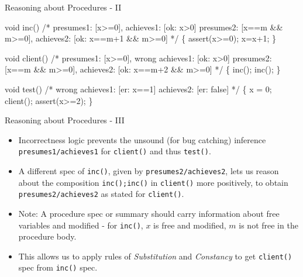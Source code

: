 \documentclass[
  10pt,
  ignorenonframetext,
]{beamer}
\newenvironment{Shaded}{\begin{snugshade}}{\end{snugshade}}
\newcommand{\CommentTok}[1]{\textcolor[rgb]{0.48,0.49,0.49}{#1}}
\newcommand{\DataTypeTok}[1]{\textcolor[rgb]{0.16,0.50,0.73}{#1}}
\newcommand{\DecValTok}[1]{\textcolor[rgb]{0.96,0.45,0.00}{#1}}
\newcommand{\NormalTok}[1]{\textcolor[rgb]{0.81,0.81,0.76}{#1}}
\newcommand{\OperatorTok}[1]{\textcolor[rgb]{0.81,0.81,0.76}{#1}}
\begin{document}
\begin{frame}[fragile]{Reasoning about Procedures - II}
\label{reasoning-about-procedures---ii}
\begin{Shaded}
\begin{Highlighting}[]
\DataTypeTok{void}\NormalTok{ inc}\OperatorTok{()}
\CommentTok{/* presumes1: [x\textgreater{}=0], achieves1: [ok: x\textgreater{}0]}
\CommentTok{   presumes2: [x==m \&\& m\textgreater{}=0], achieves2: [ok: x==m+1 \&\& m\textgreater{}=0] */}
\OperatorTok{\{}\NormalTok{   assert}\OperatorTok{(}\NormalTok{x}\OperatorTok{\textgreater{}=}\DecValTok{0}\OperatorTok{);}
\NormalTok{    x}\OperatorTok{=}\NormalTok{x}\OperatorTok{+}\DecValTok{1}\OperatorTok{;}
\OperatorTok{\}}

\DataTypeTok{void}\NormalTok{ client}\OperatorTok{()}
\CommentTok{/* presumes1: [x\textgreater{}=0], wrong achieves1: [ok: x\textgreater{}0]}
\CommentTok{   presumes2: [x==m \&\& m\textgreater{}=0], achieves2: [ok: x==m+2 \&\& m\textgreater{}=0] */}
\OperatorTok{\{}\NormalTok{   inc}\OperatorTok{();}\NormalTok{ inc}\OperatorTok{();} \OperatorTok{\}}

\DataTypeTok{void}\NormalTok{ test}\OperatorTok{()}
\CommentTok{/* wrong achieves1: [er: x==1]}
\CommentTok{   achieves2: [er: false] */}
\OperatorTok{\{}\NormalTok{   x }\OperatorTok{=} \DecValTok{0}\OperatorTok{;}
\NormalTok{    client}\OperatorTok{();}
\NormalTok{    assert}\OperatorTok{(}\NormalTok{x}\OperatorTok{\textgreater{}=}\DecValTok{2}\OperatorTok{);}
\OperatorTok{\}}
\end{Highlighting}
\end{Shaded}
\end{frame}

\begin{frame}[fragile]{Reasoning about Procedures - III}
\label{reasoning-about-procedures---iii}
\begin{itemize}
\item
  Incorrectness logic prevents the unsound (for bug catching) inference
  \texttt{presumes1/achieves1} for \texttt{client()} and thus
  \texttt{test()}.
\item
  A different spec of \texttt{inc()}, given by
  \texttt{presumes2/achieves2}, lets us reason about the composition
  \texttt{inc();inc()} in \texttt{client()} more positively, to obtain
  \texttt{presumes2/achieves2} as stated for \texttt{client()}.
\item
  Note: A procedure spec or summary should carry information about free
  variables and modified - for \texttt{inc()}, \(x\) is free and
  modified, \(m\) is not free in the procedure body.
\item
  This allows us to apply rules of \emph{Substitution} and
  \emph{Constancy} to get \texttt{client()} spec from \texttt{inc()}
  spec.
\end{itemize}
\end{frame}
\end{document}

